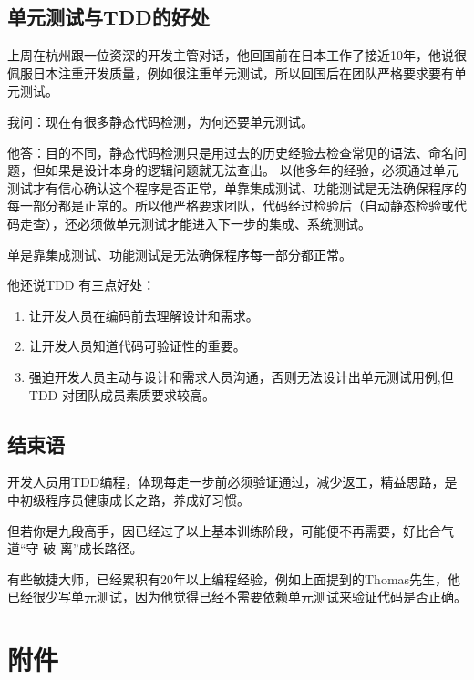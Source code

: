 \hypertarget{ux5355ux5143ux6d4bux8bd5ux4e0etddux7684ux597dux5904}{%
\subsection{单元测试与TDD的好处}\label{ux5355ux5143ux6d4bux8bd5ux4e0etddux7684ux597dux5904}}

上周在杭州跟一位资深的开发主管对话，他回国前在日本工作了接近10年，他说很佩服日本注重开发质量，例如很注重单元测试，所以回国后在团队严格要求要有单元测试。

我问：现在有很多静态代码检测，为何还要单元测试。

他答：目的不同，静态代码检测只是用过去的历史经验去检查常见的语法、命名问题，但如果是设计本身的逻辑问题就无法查出。
以他多年的经验，必须通过单元测试才有信心确认这个程序是否正常，单靠集成测试、功能测试是无法确保程序的每一部分都是正常的。所以他严格要求团队，代码经过检验后（自动静态检验或代码走查），还必须做单元测试才能进入下一步的集成、系统测试。

单是靠集成测试、功能测试是无法确保程序每一部分都正常。

他还说TDD 有三点好处：

\begin{enumerate}
\tightlist
\item
  让开发人员在编码前去理解设计和需求。
\item
  让开发人员知道代码可验证性的重要。
\item
  强迫开发人员主动与设计和需求人员沟通，否则无法设计出单元测试用例,但TDD
  对团队成员素质要求较高。
\end{enumerate}

\hypertarget{ux7ed3ux675fux8bed}{%
\subsection{结束语}\label{ux7ed3ux675fux8bed}}

开发人员用TDD编程，体现每走一步前必须验证通过，减少返工，精益思路，是中初级程序员健康成长之路，养成好习惯。

但若你是九段高手，因已经过了以上基本训练阶段，可能便不再需要，好比合气道``守
破 离''成长路径。

有些敏捷大师，已经累积有20年以上编程经验，例如上面提到的Thomas先生，他已经很少写单元测试，因为他觉得已经不需要依赖单元测试来验证代码是否正确。


\hypertarget{ux9644ux4ef6}{%
\section{附件}\label{ux9644ux4ef6}}

